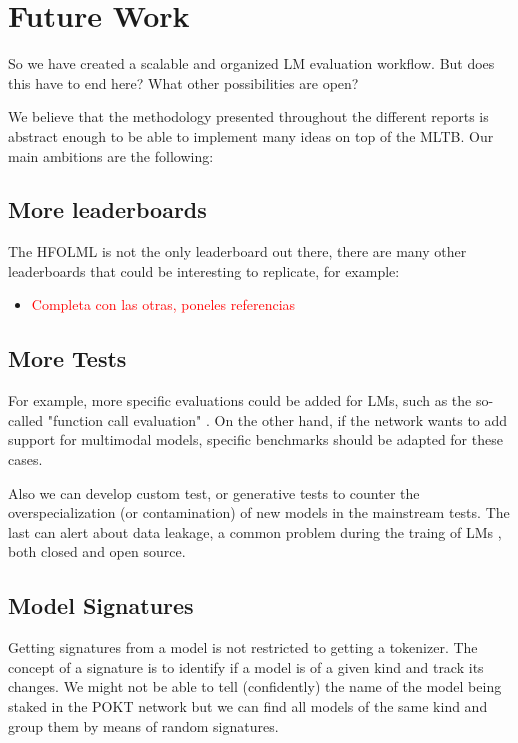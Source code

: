\section{Future Work}\label{sec:z}

So we have created a scalable and organized \gls{LM} evaluation workflow. 
But does this have to end here? What other possibilities are open?

We believe that the methodology presented throughout the different reports is abstract enough to be able to implement many ideas on top of the \gls{MLTB}. Our main ambitions are the following:

\subsection*{More leaderboards}

The \gls{HFOLML} is not the only leaderboard out there, there are many other leaderboards that could be interesting to replicate, for example:
\begin{itemize}
    \item \textcolor{red}{Completa con las otras, poneles referencias}
\end{itemize}

\subsection*{More Tests}

For example, more specific evaluations could be added for \glspl{LM}, such as the so-called "function call evaluation" \cite{patil_gorilla_2023}. 
On the other hand, if the network wants to add support for multimodal models, specific benchmarks \cite{yue_mmmu_2024} should be adapted for these cases. 

Also we can develop custom test, or generative tests to counter the overspecialization (or contamination) of new models in the mainstream tests. 
The last can alert about data leakage, a common problem during the traing of \glspl{LM} \cite{zhang_careful_2024, golchin_data_2024, xu_benchmarking_2024, balloccu_leak_2024}, both closed and open source. 

\subsection*{Model Signatures}

Getting signatures from a model is not restricted to getting a tokenizer. 
The concept of a signature is to identify if a model is of a given kind and track its changes. 
We might not be able to tell (confidently) the name of the model being staked in the POKT network but we can find all models of the same kind and group them by means of random signatures.

